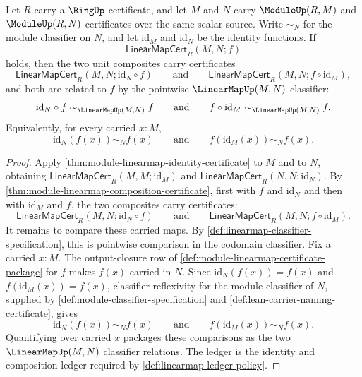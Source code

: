 \begin{theorem}
\label{thm:module-linearmap-identity-unit-laws}
Let $R$ carry a $\RingUp$ certificate, and let $M$ and $N$ carry $\ModuleUp(R,M)$ and $\ModuleUp(R,N)$ certificates over the same scalar source. Write $\sim_N$ for the module classifier on $N$, and let $\mathrm{id}_M$ and $\mathrm{id}_N$ be the identity functions. If
$$
\mathsf{LinearMapCert}_R(M,N;f)
$$
holds, then the two unit composites carry certificates
$$
\mathsf{LinearMapCert}_R(M,N;\mathrm{id}_N\circ f)\qquad\text{and}\qquad\mathsf{LinearMapCert}_R(M,N;f\circ\mathrm{id}_M),
$$
and both are related to $f$ by the pointwise $\LinearMapUp(M,N)$ classifier:
$$
\mathrm{id}_N\circ f\sim_{\LinearMapUp(M,N)}f\qquad\text{and}\qquad f\circ\mathrm{id}_M\sim_{\LinearMapUp(M,N)}f.
$$
Equivalently, for every carried $x:M$,
$$
\mathrm{id}_N(f(x))\sim_N f(x)\qquad\text{and}\qquad f(\mathrm{id}_M(x))\sim_N f(x).
$$
\end{theorem}
\begin{proof}
Apply \autoref{thm:module-linearmap-identity-certificate} to $M$ and to $N$, obtaining $\mathsf{LinearMapCert}_R(M,M;\mathrm{id}_M)$ and $\mathsf{LinearMapCert}_R(N,N;\mathrm{id}_N)$.
By \autoref{thm:module-linearmap-composition-certificate}, first with $f$ and $\mathrm{id}_N$ and then with $\mathrm{id}_M$ and $f$, the two composites carry certificates:
$$
\mathsf{LinearMapCert}_R(M,N;\mathrm{id}_N\circ f)\qquad\text{and}\qquad\mathsf{LinearMapCert}_R(M,N;f\circ\mathrm{id}_M).
$$
It remains to compare these carried maps. By \autoref{def:linearmap-classifier-specification}, this is pointwise comparison in the codomain classifier. Fix a carried $x:M$.
The output-closure row of \autoref{def:module-linearmap-certificate-package} for $f$ makes $f(x)$ carried in $N$.
Since $\mathrm{id}_N(f(x))=f(x)$ and $f(\mathrm{id}_M(x))=f(x)$, classifier reflexivity for the module classifier of $N$, supplied by \autoref{def:module-classifier-specification} and \autoref{def:lean-carrier-naming-certificate}, gives
$$
\mathrm{id}_N(f(x))\sim_N f(x)\qquad\text{and}\qquad f(\mathrm{id}_M(x))\sim_N f(x).
$$
Quantifying over carried $x$ packages these comparisons as the two $\LinearMapUp(M,N)$ classifier relations. The ledger is the identity and composition ledger required by \autoref{def:linearmap-ledger-policy}.
\end{proof}


